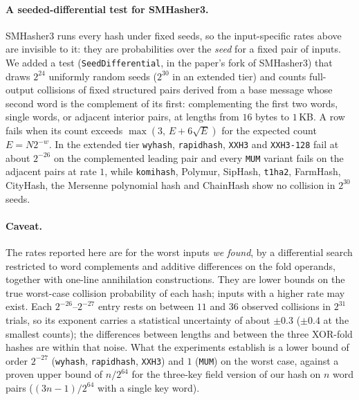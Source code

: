 \paragraph{A seeded-differential test for SMHasher3.}
SMHasher3 runs every hash under fixed seeds, so the input-specific rates above
are invisible to it: they are probabilities over the \emph{seed} for a fixed
pair of inputs.  We added a test (\texttt{SeedDifferential}, in the paper's
fork of SMHasher3) that draws $2^{24}$ uniformly random seeds ($2^{30}$ in an
extended tier) and counts full-output collisions of fixed structured pairs
derived from a base message whose second word is the complement of its first:
complementing the first two words, single words, or adjacent interior pairs,
at lengths from $16$ bytes to $1$\,KB.  A row fails when its count exceeds
$\max(3,\,E+6\sqrt{E})$ for the expected count $E=N2^{-w}$.  In the extended
tier \texttt{wyhash}, \texttt{rapidhash}, \texttt{XXH3} and \texttt{XXH3-128}
fail at about $2^{-26}$ on the complemented leading pair and every
\texttt{MUM} variant fails on the adjacent pairs at rate $1$, while
\texttt{komihash}, Polymur, SipHash, \texttt{t1ha2}, FarmHash, CityHash, the
Mersenne polynomial hash and ChainHash show no collision in $2^{30}$ seeds.

\paragraph{Caveat.}
The rates reported here are for the worst inputs \emph{we found}, by a
differential search restricted to word complements and additive differences on
the fold operands, together with one-line annihilation constructions.  They are
lower bounds on the true worst-case collision probability of each hash; inputs
with a higher rate may exist.  Each $2^{-26}$--$2^{-27}$ entry rests on between
$11$ and $36$ observed collisions in $2^{31}$ trials, so its exponent carries a
statistical uncertainty of about $\pm0.3$ ($\pm0.4$ at the smallest counts); the differences between lengths and
between the three XOR-fold hashes are within that noise.  What the experiments
establish is a lower bound of order $2^{-27}$ (\texttt{wyhash},
\texttt{rapidhash}, \texttt{XXH3}) and $1$ (\texttt{MUM}) on the worst case,
against a proven upper bound of $n/2^{64}$ for the three-key field version of
our hash on $n$ word pairs ($(3n-1)/2^{64}$ with a single key word).

